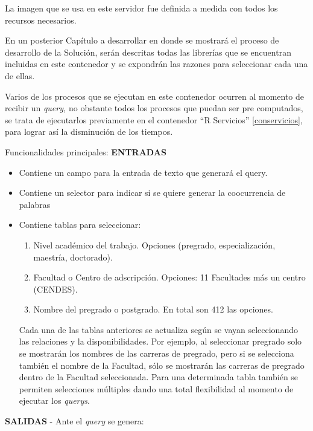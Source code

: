 \documentclass[
  10,
  spanish,
  openany]{book}
\providecommand{\tightlist}{%
  \setlength{\itemsep}{0pt}\setlength{\parskip}{0pt}}
\begin{document}
La imagen que se usa en este servidor fue definida a medida con todos los recursos necesarios.

En un posterior Capítulo a desarrollar en donde se mostrará el proceso de desarrollo de la Solución, serán descritas todas las librerías que se encuentran incluidas en este contenedor y se expondrán las razones para seleccionar cada una de ellas.

Varios de los procesos que se ejecutan en este contenedor ocurren al momento de recibir un \emph{query,} no obstante todos los procesos que puedan ser pre computados, se trata de ejecutarlos previamente en el contenedor ``R Servicios'' \ref{conservicios}, para lograr así la disminución de los tiempos.

Funcionalidades principales: \textbf{ENTRADAS}

\begin{itemize}
\item
  Contiene un campo para la entrada de texto que generará el query.
\item
  Contiene un selector para indicar si se quiere generar la coocurrencia de palabras
\item
  Contiene tablas para seleccionar:

  \begin{enumerate}
  \def\labelenumi{\arabic{enumi})}
  \tightlist
  \item
    Nivel académico del trabajo. Opciones (pregrado, especialización, maestría, doctorado).
  \item
    Facultad o Centro de adscripción. Opciones: 11 Facultades más un centro (CENDES).
  \item
    Nombre del pregrado o postgrado. En total son 412 las opciones.
  \end{enumerate}

  Cada una de las tablas anteriores se actualiza según se vayan seleccionando las relaciones y la disponibilidades. Por ejemplo, al seleccionar pregrado solo se mostrarán los nombres de las carreras de pregrado, pero si se selecciona también el nombre de la Facultad, sólo se mostrarán las carreras de pregrado dentro de la Facultad seleccionada. Para una determinada tabla también se permiten selecciones múltiples dando una total flexibilidad al momento de ejecutar los \emph{querys}.
\end{itemize}

\textbf{SALIDAS} - Ante el \emph{query} se genera:
\end{document}
